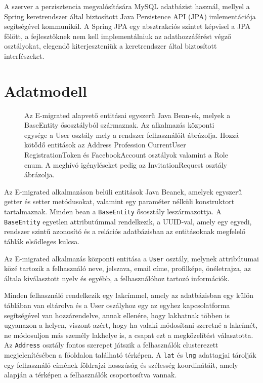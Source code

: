 A szerver a perzisztencia megvalósítására MySQL adatbázist használ, mellyel a Spring keretrendszer által biztosított Java Persistence API (JPA) imlementációja segítségével kommunikál. A Spring JPA egy absztrakciós szintet képvisel a JPA fölött, a fejlesztőknek nem kell implementálniuk az adathozzáférést végző osztályokat, elegendő kiterjeszteniük a keretrendszer által biztosított interfészeket. 



\section{Adatmodell}\label{sec:projektrol:adatmodell}
\begin{figure}[!t]
  \centering
  \caption{Az E-migrated alapvető entitásai egyszerű Java Bean-ek, melyek a BaseEntity ősosztályból származnak. Az alkalmazás központi egysége a User osztály\protect{,} mely a rendszer felhasználóit ábrázolja. Hozzá kötődő entitások az Address\protect{,} Profession\protect{,} CurrentUser\protect{,} RegistrationToken és FacebookAccount osztályok\protect{,} valamint a Role enum. A meghívó igényléseket pedig az InvitationRequest osztály ábrázolja.}
  \label{fig:adatmodell}
\end{figure}

Az E-migrated alkalmazáson belüli entitások Java Beanek, amelyek egyszerű getter és setter
metódusokat, valamint egy paraméter nélküli konstruktort tartalmaznak. Minden bean a \texttt{BaseEntity} ősosztály leszármazottja. A \texttt{BaseEntity} egyetlen attributúmmal rendelkezik, a UUID-val, amely egy egyedi, rendszer szintű azonosító és a relációs adatbázisban az entitásoknak megfelelő táblák elsődleges kulcsa. 

Az E-migrated alkalmazás központi entitása a \texttt{User} osztály,  melynek attribútumai közé tartozik a felhasználó neve, jelszava, email címe, profilképe, önéletrajza, az általa kiválasztott nyelv és egyébb, a felhasználóhoz tartozó információk. 



Minden felhasználó rendelkezik egy lakcímmel, amely az adatbázisban egy külön táblában van eltárolva és a User oszályhoz egy az egyhez kapcsolatforma segítségével van hozzárendelve, annak ellenére, hogy lakhatnak többen is ugyanazon a helyen, viszont azért, hogy ha valaki módosítani szeretné a lakcímét, ne módosuljon más személy lakhelye is, a csapat ezt a megközelítést választotta. Az \texttt{Address} osztály fontos szerepet játszik a felhasználók clusterezett megjelenítésében a főoldalon található térképen. A \texttt{lat} és \texttt{lng} adattagjai tárolják egy felhasználó címének földrajzi hosszúság és szélesség koordinátáit, amely alapján a térképen a felhasználók csoportosítva vannak. 

